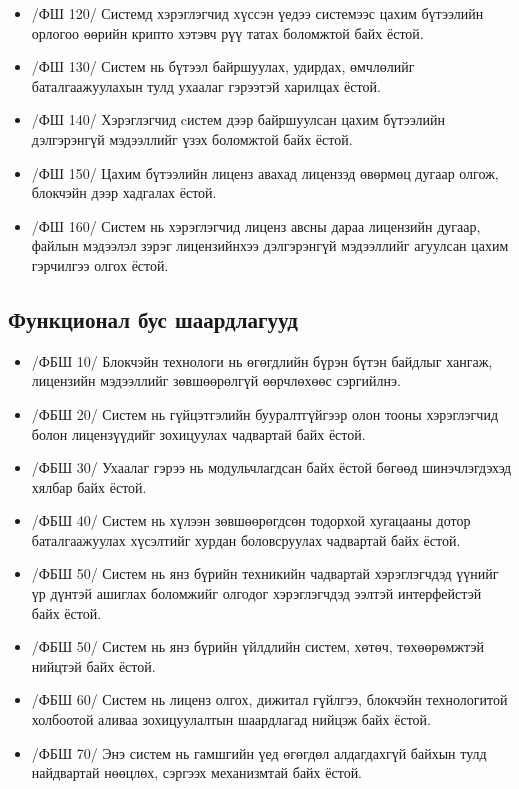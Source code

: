 \begin{itemize}
      \item[] /ФШ 120/  Системд хэрэглэгчид хүссэн үедээ системээс цахим бүтээлийн орлогоо өөрийн крипто хэтэвч рүү татах боломжтой байх ёстой.
      \item[] /ФШ 130/  Систем нь бүтээл байршуулах, удирдах, өмчлөлийг баталгаажуулахын тулд ухаалаг гэрээтэй харилцах ёстой.
      \item[] /ФШ 140/  Хэрэглэгчид cистем дээр байршуулсан цахим бүтээлийн дэлгэрэнгүй мэдээллийг үзэх боломжтой байх ёстой.
      \item[] /ФШ 150/  Цахим бүтээлийн лиценз авахад лицензэд өвөрмөц дугаар олгож, блокчэйн дээр хадгалах ёстой.
      \item[] /ФШ 160/  Систем нь хэрэглэгчид лиценз авсны дараа лицензийн дугаар, файлын мэдээлэл зэрэг лицензийнхээ дэлгэрэнгүй мэдээллийг агуулсан цахим гэрчилгээ олгох ёстой.
\end{itemize}

\subsection{Функционал бус шаардлагууд}
\begin{itemize}
   \item[] /ФБШ 10/ Блокчэйн технологи нь өгөгдлийн бүрэн бүтэн байдлыг хангаж, лицензийн мэдээллийг зөвшөөрөлгүй өөрчлөхөөс сэргийлнэ.
   \item[] /ФБШ 20/ Систем нь гүйцэтгэлийн бууралтгүйгээр олон тооны хэрэглэгчид болон лицензүүдийг зохицуулах чадвартай байх ёстой.
   \item[] /ФБШ 30/ Ухаалаг гэрээ нь модульчлагдсан байх ёстой бөгөөд шинэчлэгдэхэд хялбар байх ёстой.
   \item[] /ФБШ 40/ Систем нь хүлээн зөвшөөрөгдсөн тодорхой хугацааны дотор баталгаажуулах хүсэлтийг хурдан боловсруулах чадвартай байх ёстой.
   \item[] /ФБШ 50/ Систем нь янз бүрийн техникийн чадвартай хэрэглэгчдэд үүнийг үр дүнтэй ашиглах боломжийг олгодог хэрэглэгчдэд ээлтэй интерфейстэй байх ёстой.
   \item[] /ФБШ 50/ Систем нь янз бүрийн үйлдлийн систем, хөтөч, төхөөрөмжтэй нийцтэй байх ёстой.
   \item[] /ФБШ 60/ Систем нь лиценз олгох, дижитал гүйлгээ, блокчэйн технологитой холбоотой аливаа зохицуулалтын шаардлагад нийцэж байх ёстой.
   \item[] /ФБШ 70/ Энэ систем нь гамшгийн үед өгөгдөл алдагдахгүй байхын тулд найдвартай нөөцлөх, сэргээх механизмтай байх ёстой.
\end{itemize}

